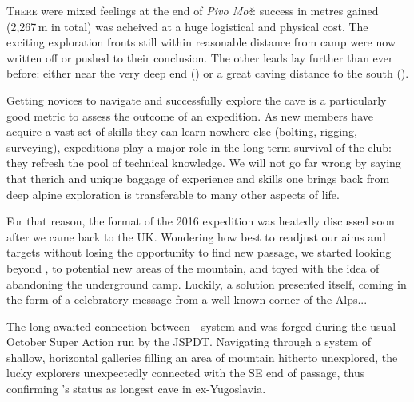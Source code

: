 \newpage
\thispagestyle{endchapter}

\begin{tcolorbox}
\vspace{80pt}
	\lettrine{T}{here} were mixed feelings at the end of \emph{Pivo Mo\v{z}}: success in metres gained (2,267\,m in total) was acheived at a huge logistical and physical cost. The exciting exploration fronts still within reasonable distance from  camp were now written off or pushed to their conclusion. The other leads lay further than ever before: either near the very deep end () or a great caving distance to the south ().

	Getting novices to navigate and successfully explore the cave is a particularly good metric to assess the outcome of an expedition. As new members have acquire a vast set of skills they can learn nowhere else (bolting, rigging, surveying), expeditions play a major role in the long term survival of the club: they refresh the pool of technical knowledge. We will not go far wrong by saying that therich and unique baggage of experience and skills one brings back from deep alpine exploration is transferable to many other aspects of life.

	For that reason, the format of the 2016 expedition was heatedly discussed soon after we came back to the UK. Wondering how best to readjust our aims and targets without losing the opportunity to find new passage, we started looking beyond , to potential new areas of the mountain, and toyed with the idea of abandoning the underground camp. Luckily, a solution presented itself, coming in the form of a celebratory message from a well known corner of the Alps...

	The long awaited connection between  -  system and   was forged during the usual October Super Action run by the JSPDT. Navigating through a system of shallow, horizontal galleries filling an area of mountain hitherto unexplored, the lucky explorers unexpectedly connected with the SE end of  passage, thus confirming 's status as longest cave in ex-Yugoslavia.

	
\end{tcolorbox}

